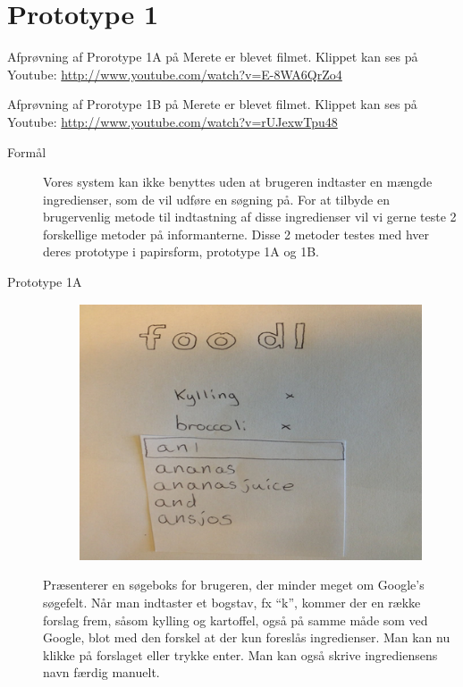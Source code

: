 \section{Prototype 1}
\label{ap:prototype1}

Afprøvning af Prorotype 1A på Merete er blevet filmet. Klippet kan ses på Youtube: \url{http://www.youtube.com/watch?v=E-8WA6QrZo4}

Afprøvning af Prorotype 1B på Merete er blevet filmet. Klippet kan ses på Youtube: \url{http://www.youtube.com/watch?v=rUJexwTpu48}

\begin{description}
\item[Formål] Vores system kan ikke benyttes uden at brugeren indtaster en mængde ingredienser, som de vil udføre en søgning på. For at tilbyde en brugervenlig metode til indtastning af disse ingredienser vil vi gerne teste 2 forskellige metoder på informanterne. Disse 2 metoder testes med hver deres prototype i papirsform, prototype 1A og 1B.
\item[Prototype 1A]

\begin{figure}[H]
\centering
\includegraphics[scale=0.7]{billeder/prototyper/prototype1a.png}
\label{fig:prototype1a}
\end{figure}

Præsenterer en søgeboks for brugeren, der minder meget om Google’s søgefelt. Når man indtaster et bogstav, fx “k”, kommer der en række forslag frem, såsom kylling og kartoffel, også på samme måde som ved Google, blot med den forskel at der kun foreslås ingredienser. Man kan nu klikke på forslaget eller trykke enter. Man kan også skrive ingrediensens navn færdig manuelt.


\end{description}
